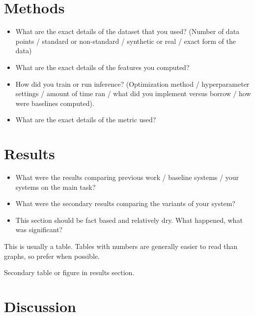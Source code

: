 \documentclass{article}
\begin{document}
\section{Methods}

\begin{itemize}
\item What are the exact details of the dataset that you used? (Number of data points / standard or non-standard / synthetic or real / exact form of the data)

\item What are the exact details of the features you computed?


\item How did you train or run inference? (Optimization method / hyperparameter settings / amount of time ran / what did you implement versus borrow / how were baselines computed).

\item What are the exact details of the metric used?
\end{itemize}


\section{Results}

\begin{itemize}
\item What were the results comparing previous work / baseline systems / your systems on the main task?
\item What were the secondary results comparing the variants of your system?
\item This section should be fact based and relatively dry. What happened, what was significant?
\end{itemize}

\begin{table*}
  \centering
  \missingfigure{}
  \caption{This is usually a table. Tables with numbers are generally easier to read than graphs, so prefer when possible.}
  \label{fig:mainres}
\end{table*}


\begin{table}
  \centering
  \missingfigure[figheight=5cm]{}
  \caption{Secondary table or figure in results section.}
  \label{fig:mainres}
\end{table}


\section{Discussion}
\end{document}
